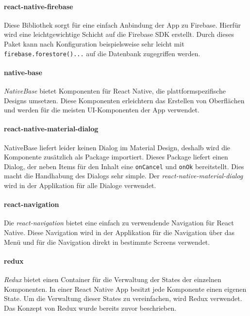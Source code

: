 \paragraph{react-native-firebase}
Diese Bibliothek sorgt für eine einfach Anbindung der App zu Firebase. Hierfür wird eine leichtgewichtige
Schicht auf die Firebase SDK erstellt. Durch dieses Paket kann nach Konfiguration beispielsweise sehr leicht mit  \texttt{firebase.forestore()...} auf die
Datenbank zugegriffen werden.
\cite{invertas78:online}

\paragraph{native-base}
\textit{NativeBase} bietet
Komponenten für React Native, die plattformspezifische Designs umsetzen. Diese Komponenten erleichtern das Erstellen von Oberflächen und werden für die meisten UI-Komponenten der App
verwendet. \cite{NativeBase:online}

\paragraph{react-native-material-dialog}
NativeBase liefert leider keinen Dialog im Material Design, deshalb wird die Komponente zusätzlich als Package
importiert. Dieses Package liefert einen Dialog, der neben Items für den Inhalt eine \texttt{onCancel} und
\texttt{onOk} bereitstellt. Dies macht die Handhabung des Dialogs sehr simple. Der \textit{react-native-material-dialog}
wird in der Applikation für alle Dialoge verwendet.
\cite{MaterialDialog:online}

\paragraph{react-navigation}
Die \textit{react-navigation} bietet eine einfach zu verwendende Navigation für React Native.
Diese Navigation wird in der Applikation für die Navigation über das Menü und für die Navigation
direkt in bestimmte Screens verwendet. \cite{ReactNavigation:online}

\paragraph{redux}
\textit{Redux} bietet einen Container für die Verwaltung der States der einzelnen Komponenten.
In einer React Native App besitzt jede Komponente einen eigenen State. Um die Verwaltung dieser
States zu vereinfachen, wird Redux verwendet. Das Konzept von Redux wurde bereits zuvor beschrieben.
\cite{Redux:online}

